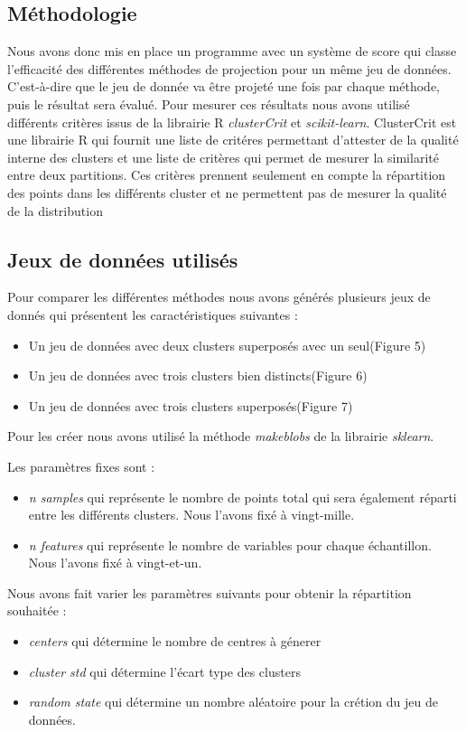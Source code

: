 \subsection{Méthodologie} 
Nous avons donc mis en place un programme avec un système de score qui classe l’efficacité des différentes méthodes de projection pour un même jeu de données. 
C’est-à-dire que le jeu de donnée va être projeté une fois par chaque méthode, puis le résultat sera évalué.
Pour mesurer ces résultats nous avons utilisé différents critères issus de la librairie R \textit{clusterCrit}\cite{desgraupes2018package} et \textit{scikit-learn}\cite{scikitpdf}.
ClusterCrit est une librairie R qui fournit une liste de critéres permettant d'attester de la qualité interne des clusters et une liste de critères qui permet 
de mesurer la similarité entre deux partitions. Ces critères prennent seulement en compte la répartition des points dans les différents cluster et ne permettent pas de 
mesurer la qualité de la distribution \cite{desgraupes2013clustering}

\subsection{Jeux de données utilisés}
Pour comparer les différentes méthodes nous avons générés plusieurs jeux de donnés qui présentent les caractéristiques suivantes :
\begin{itemize}
    \item Un jeu de données avec deux clusters superposés avec un seul(Figure 5)
    \item Un jeu de données avec trois clusters bien distincts(Figure 6)
    \item Un jeu de données avec trois clusters superposés(Figure 7)
\end{itemize}

Pour les créer nous avons utilisé la méthode \textit{makeblobs} de la librairie \textit{sklearn}. 

Les paramètres fixes sont :
\begin{itemize}
    \item \textit{n samples} qui représente le nombre de points total qui sera également réparti entre les différents clusters. Nous l'avons fixé à vingt-mille.
    \item \textit{n features} qui représente le nombre de variables pour chaque échantillon. Nous l'avons fixé à vingt-et-un.
\end{itemize}
Nous avons fait varier les paramètres suivants pour obtenir la répartition souhaitée : 
\begin{itemize}
    \item \textit{centers} qui détermine le nombre de centres à génerer
    \item \textit{cluster std} qui détermine l'écart type des clusters
    \item \textit{random state} qui détermine un nombre aléatoire pour la crétion du jeu de données.
\end{itemize}


